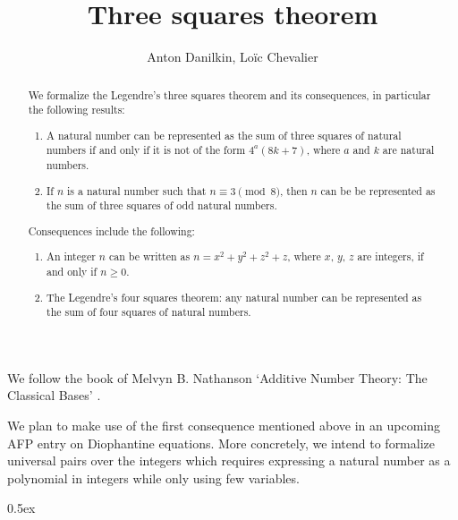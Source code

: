 \documentclass[11pt, a4paper]{article}
\begin{document}
\title{Three squares theorem}
\author{Anton Danilkin, Loïc Chevalier}
\maketitle

\begin{abstract}
  We formalize the Legendre's three squares theorem and its consequences,
  in particular the following results:
  \begin{enumerate}
    \item A natural number can be represented as the sum of
          three squares of natural numbers if and only if it is not
          of the form $4^a (8 k + 7)$, where $a$ and $k$ are natural numbers.
    \item If $n$ is a natural number such that $n \equiv 3 \pmod{8}$,
          then $n$ can be be represented as the sum of three squares
          of odd natural numbers.
  \end{enumerate}

  Consequences include the following:
  \begin{enumerate}
    \item An integer $n$ can be written as $n = x^2 + y^2 + z^2 + z$,
          where $x$, $y$, $z$ are integers, if and only if $n \geq 0$.
    \item The Legendre's four squares theorem: any natural number
          can be represented as the sum of four squares of natural numbers.
  \end{enumerate}
\end{abstract}

We follow the book of Melvyn B. Nathanson
`Additive Number Theory: The Classical Bases' \cite{nathanson1996}.

We plan to make use of the first consequence mentioned above in an
upcoming AFP entry on Diophantine equations. More concretely, we intend
to formalize universal pairs over the integers which requires expressing
a natural number as a polynomial in integers while only using few variables.

\tableofcontents

\parindent 0pt\parskip 0.5ex





\end{document}
